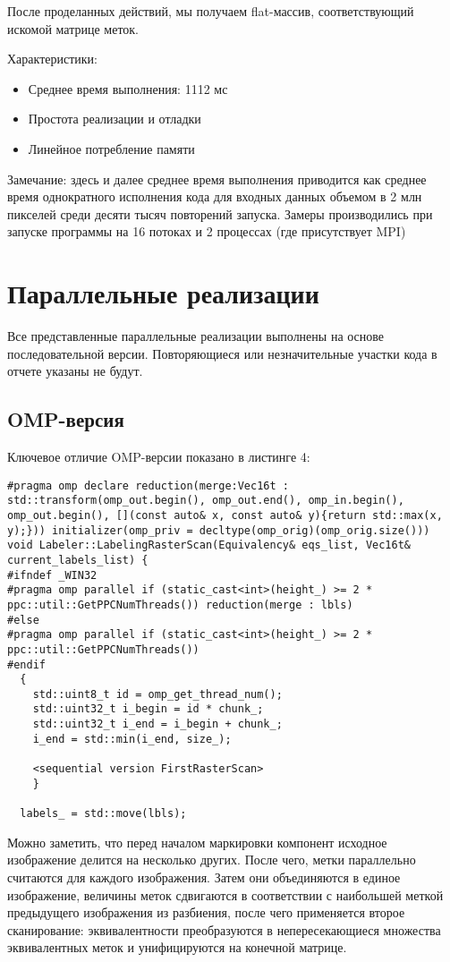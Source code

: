 \documentclass[a4paper,14pt]{article}
\begin{document}
После проделанных действий, мы получаем flat-массив, соответствующий искомой матрице меток.

Характеристики:
\begin{itemize}
    \item Среднее время выполнения: 1112 мс
    \item Простота реализации и отладки
    \item Линейное потребление памяти
\end{itemize}
Замечание: здесь и далее среднее время выполнения приводится как среднее время однократного исполнения кода для входных данных объемом в 2 млн пикселей среди десяти тысяч повторений запуска. Замеры производились при запуске программы на 16 потоках и 2 процессах (где присутствует MPI)

\section{Параллельные реализации}
Все представленные параллельные реализации выполнены на основе последовательной версии. Повторяющиеся или незначительные участки кода в отчете указаны не будут.
\subsection{OMP-версия}
Ключевое отличие OMP-версии показано в листинге 4:

\begin{lstlisting}[caption=Ключевые особенности OMP версии]
#pragma omp declare reduction(merge:Vec16t : std::transform(omp_out.begin(), omp_out.end(), omp_in.begin(), omp_out.begin(), [](const auto& x, const auto& y){return std::max(x, y);})) initializer(omp_priv = decltype(omp_orig)(omp_orig.size()))
void Labeler::LabelingRasterScan(Equivalency& eqs_list, Vec16t& current_labels_list) {
#ifndef _WIN32
#pragma omp parallel if (static_cast<int>(height_) >= 2 * ppc::util::GetPPCNumThreads()) reduction(merge : lbls)
#else
#pragma omp parallel if (static_cast<int>(height_) >= 2 * ppc::util::GetPPCNumThreads())
#endif
  {
    std::uint8_t id = omp_get_thread_num();
    std::uint32_t i_begin = id * chunk_;
    std::uint32_t i_end = i_begin + chunk_;
    i_end = std::min(i_end, size_);

    <sequential version FirstRasterScan>
    }
    
  labels_ = std::move(lbls);
\end{lstlisting}
Можно заметить, что перед началом маркировки компонент исходное изображение делится на несколько других. После чего, метки параллельно считаются для каждого изображения. Затем они объединяются в единое изображение, величины меток сдвигаются в соответствии с наибольшей меткой предыдущего изображения из разбиения, после чего применяется второе сканирование: эквивалентности преобразуются в непересекающиеся множества эквивалентных меток и унифицируются на конечной матрице.
\end{document}
